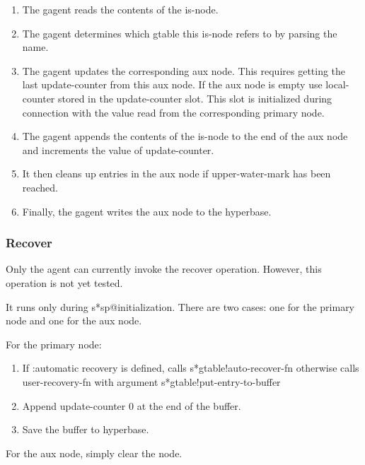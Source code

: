 \begin{enumerate}

\item The gagent reads the contents of the is-node.
  
\item The gagent determines which gtable this is-node refers to by parsing
the name.

\item The gagent updates the corresponding aux node.  This requires
  getting the last update-counter from this aux node. If the aux node is
  empty use local-counter stored in the update-counter slot.  This slot is
  initialized during connection with the value read from the corresponding
  primary node.
        
\item The gagent appends the contents of the is-node to the end of the
  aux node and increments the value of update-counter.
  
\item It then cleans up entries in the aux node if upper-water-mark has
  been reached.

\item Finally, the gagent writes the aux node to the hyperbase.

\end{enumerate}



\subsubsection{Recover}

Only the agent can currently invoke the recover operation.  However, this
operation is not yet tested.

It runs only during s*sp@initialization.  There are two cases: one for the
primary node and one for the aux node.

For the primary node:
\begin{enumerate}
\item If :automatic recovery is defined, calls s*gtable!auto-recover-fn
           otherwise calls user-recovery-fn with argument
           s*gtable!put-entry-to-buffer
\item Append update-counter 0 at the end of the buffer.
\item Save the buffer to hyperbase.
\end{enumerate}

For the aux node, simply clear the node.


